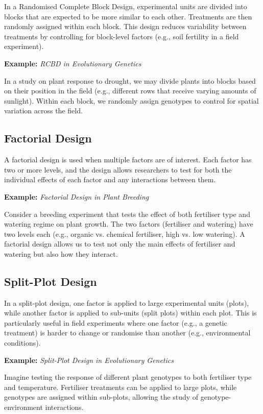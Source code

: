 \documentclass[12pt,a4paper]{article}
\newenvironment{example}[1][]
{\begin{basebox}[linecolor=uqgold]
\textbf{\color{uqgold}Example:} \textit{#1}\par\noindent\ignorespaces}
{\end{basebox}}
\begin{document}
In a Randomised Complete Block Design, experimental units are divided into blocks that are expected to be more similar to each other. Treatments are then randomly assigned within each block. This design reduces variability between treatments by controlling for block-level factors (e.g., soil fertility in a field experiment).

\begin{example}[RCBD in Evolutionary Genetics]
In a study on plant response to drought, we may divide plants into blocks based on their position in the field (e.g., different rows that receive varying amounts of sunlight). Within each block, we randomly assign genotypes to control for spatial variation across the field.
\end{example}

\subsection{Factorial Design}

A factorial design is used when multiple factors are of interest. Each factor has two or more levels, and the design allows researchers to test for both the individual effects of each factor and any interactions between them.

\begin{example}[Factorial Design in Plant Breeding]
Consider a breeding experiment that tests the effect of both fertiliser type and watering regime on plant growth. The two factors (fertiliser and watering) have two levels each (e.g., organic vs. chemical fertiliser, high vs. low watering). A factorial design allows us to test not only the main effects of fertiliser and watering but also how they interact.
\end{example}

\subsection{Split-Plot Design}

In a split-plot design, one factor is applied to large experimental units (plots), while another factor is applied to sub-units (split plots) within each plot. This is particularly useful in field experiments where one factor (e.g., a genetic treatment) is harder to change or randomise than another (e.g., environmental conditions).

\begin{example}[Split-Plot Design in Evolutionary Genetics]
Imagine testing the response of different plant genotypes to both fertiliser type and temperature. Fertiliser treatments can be applied to large plots, while genotypes are assigned within sub-plots, allowing the study of genotype-environment interactions.
\end{example}
\end{document}
